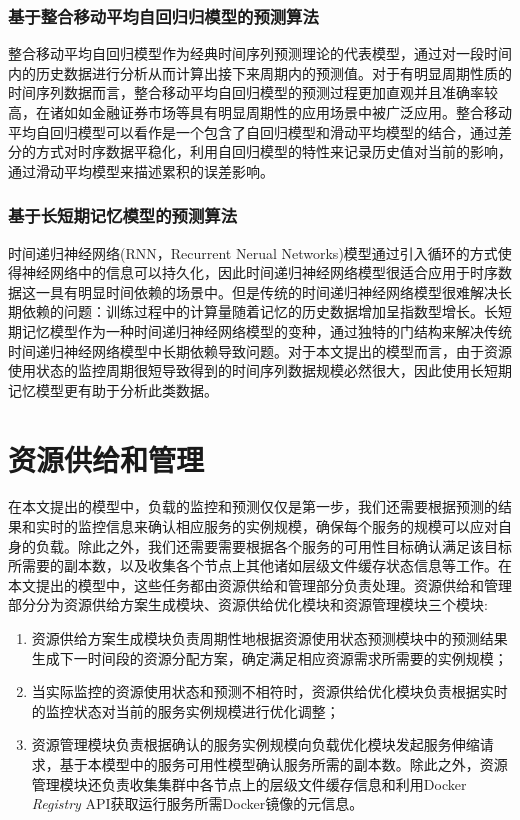 \subsubsection{基于整合移动平均自回归归模型的预测算法}
整合移动平均自回归模型作为经典时间序列预测理论的代表模型，通过对一段时间内的历史数据进行分析从而计算出接下来周期内的预测值。对于有明显周期性质的时间序列数据而言，整合移动平均自回归模型的预测过程更加直观并且准确率较高，在诸如如金融证券市场等具有明显周期性的应用场景中被广泛应用。整合移动平均自回归模型可以看作是一个包含了自回归模型和滑动平均模型的结合，通过差分的方式对时序数据平稳化，利用自回归模型的特性来记录历史值对当前的影响，通过滑动平均模型来描述累积的误差影响。

\subsubsection{基于长短期记忆模型的预测算法}
时间递归神经网络(RNN，Recurrent Nerual Networks)模型通过引入循环的方式使得神经网络中的信息可以持久化\cite{graves2012supervised}，因此时间递归神经网络模型很适合应用于时序数据这一具有明显时间依赖的场景中。但是传统的时间递归神经网络模型很难解决长期依赖的问题：训练过程中的计算量随着记忆的历史数据增加呈指数型增长\cite{bengio1994learning}。长短期记忆模型作为一种时间递归神经网络模型的变种，通过独特的门结构来解决传统时间递归神经网络模型中长期依赖导致问题。对于本文提出的模型而言，由于资源使用状态的监控周期很短导致得到的时间序列数据规模必然很大，因此使用长短期记忆模型更有助于分析此类数据。

\section{资源供给和管理}
在本文提出的模型中，负载的监控和预测仅仅是第一步，我们还需要根据预测的结果和实时的监控信息来确认相应服务的实例规模，确保每个服务的规模可以应对自身的负载。除此之外，我们还需要需要根据各个服务的可用性目标确认满足该目标所需要的副本数，以及收集各个节点上其他诸如层级文件缓存状态信息等工作。在本文提出的模型中，这些任务都由资源供给和管理部分负责处理。资源供给和管理部分分为资源供给方案生成模块、资源供给优化模块和资源管理模块三个模块:
\begin{enumerate}
\item 资源供给方案生成模块负责周期性地根据资源使用状态预测模块中的预测结果生成下一时间段的资源分配方案，确定满足相应资源需求所需要的实例规模；
\item 当实际监控的资源使用状态和预测不相符时，资源供给优化模块负责根据实时的监控状态对当前的服务实例规模进行优化调整；
\item 资源管理模块负责根据确认的服务实例规模向负载优化模块发起服务伸缩请求，基于本模型中的服务可用性模型确认服务所需的副本数。除此之外，资源管理模块还负责收集集群中各节点上的层级文件缓存信息和利用Docker \emph{Registry} API获取运行服务所需Docker镜像的元信息。
\end{enumerate}

